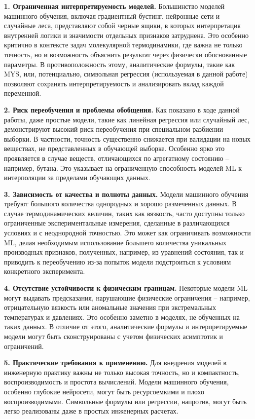 \documentclass[a4paper,12pt]{article}
\begin{document}
\textbf{1. Ограниченная интерпретируемость моделей.}
Большинство моделей машинного обучения, включая градиентный бустинг, нейронные сети и случайные леса, представляют собой черные ящики, в которых интерпретация внутренней логики и значимости отдельных признаков затруднена. Это особенно критично в контексте задач молекулярной термодинамики, где важна не только точность, но и возможность объяснить результат через физически обоснованные параметры. В противоположность этому, аналитические формулы, такие как MYS, или, потенциально, символьная регрессия (используемая в данной работе) позволяют сохранять интерпретируемость и анализировать вклад каждой переменной.

\textbf{2. Риск переобучения и проблемы обобщения.}
Как показано в ходе данной работы, даже простые модели, такие как линейная регрессия или случайный лес, демонстрируют высокий риск переобучения при специальном разбиении выборки. В частности, точность существенно снижается при валидации на новых веществах, не представленных в обучающей выборке. Особенно ярко это проявляется в случае веществ, отличающихся по агрегатному состоянию -- например, бутана. Это указывает на ограниченную способность моделей ML к интерполяции за пределами обучающих данных.

\textbf{3. Зависимость от качества и полноты данных.}
Модели машинного обучения требуют большого количества однородных и хорошо размеченных данных. В случае термодинамических величин, таких как вязкость, часто доступны только ограниченные экспериментальные измерения, сделанные в различающихся условиях и с неоднородной точностью. Это может как ограничивать возможности ML, делая необходимым использование большего количества уникальных производных признаков, полученных, например, из уравнений состояния, так и приводить к переобучению из-за попыток модели подстроиться к условиям конкретного эксперимента.

\textbf{4. Отсутствие устойчивости к физическим границам.}
Некоторые модели ML могут выдавать предсказания, нарушающие физические ограничения -- например, отрицательную вязкость или аномальные значения при экстремальных температурах и давлениях. Это особенно заметно в моделях, не обученных на таких данных. В отличие от этого, аналитические формулы и интерпретируемые модели могут быть сконструированы с учетом физических асимптотик и ограничений.

\textbf{5. Практические требования к применению.}
Для внедрения моделей в инженерную практику важны не только высокая точность, но и компактность, воспроизводимость и простота вычислений. Модели машинного обучения, особенно глубокие нейросети, могут быть ресурсоемкими и плохо воспроизводимыми. Символьные формулы или регрессии, напротив, могут быть легко реализованы даже в простых инженерных расчетах.
\end{document}
